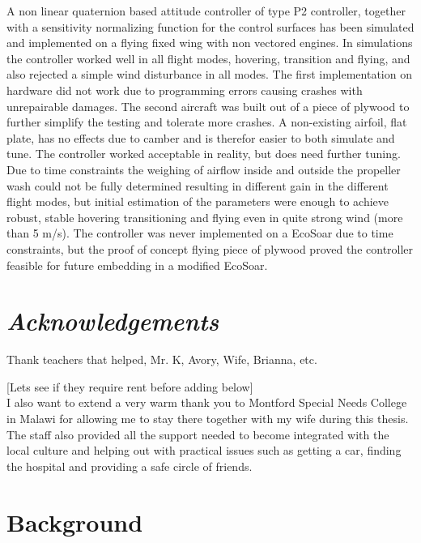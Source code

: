 \documentclass{article}
\begin{document}
\abstract
A non linear quaternion based attitude controller of type P2 controller, together with a sensitivity normalizing function for the control surfaces has been simulated and implemented on a flying fixed wing with non vectored engines.
In simulations the controller worked well in all flight modes, hovering, transition and flying, and also rejected a simple wind disturbance in all modes.
The first implementation on hardware did not work due to programming errors causing crashes with unrepairable damages.
The second aircraft was built out of a piece of plywood to further simplify the testing and tolerate more crashes.
A non-existing airfoil, flat plate, has no effects due to camber and is therefor easier to both simulate and tune.
The controller worked acceptable in reality, but does need further tuning.
Due to time constraints the weighing of airflow inside and outside the propeller wash could not be fully determined resulting in different gain in the different flight modes, but initial estimation of the parameters were enough to achieve robust, stable hovering transitioning and flying even in quite strong wind (more than 5 m/s).
The controller was never implemented on a EcoSoar due to time constraints, but the proof of concept flying piece of plywood proved the controller feasible for future embedding in a modified EcoSoar. 


\newpage
\section*{\textit{Acknowledgements}}

Thank teachers that helped, Mr. K, Avory, Wife, Brianna, etc.

[Lets see if they require rent before adding below]\\
I also want to extend a very warm thank you to Montford Special Needs College in Malawi for allowing me to stay there together with my wife during this thesis.
The staff also provided all the support needed to become integrated with the local culture and helping out with practical issues such as getting a car, finding the hospital and providing a safe circle of friends.

\newpage

\tableofcontents

\newpage

\newpage

\section{Background}

\end{document}
